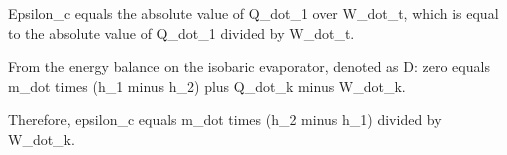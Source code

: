 Epsilon_c equals the absolute value of Q_dot_1 over W_dot_t, which is equal to the absolute value of Q_dot_1 divided by W_dot_t.

From the energy balance on the isobaric evaporator, denoted as D: zero equals m_dot times (h_1 minus h_2) plus Q_dot_k minus W_dot_k.

Therefore, epsilon_c equals m_dot times (h_2 minus h_1) divided by W_dot_k.